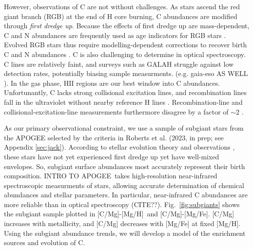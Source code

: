 \documentclass[fleqn,usenatbib]{mnras}
\newcommand{\apogee}{APOGEE}
\newcommand{\caah}{[C/Mg]-[Mg/H]}
\newcommand{\caafe}{[C/Mg]-[Mg/Fe]}
\newcommand{\about}[1]{${\sim} #1$}
\begin{document}


However, observations of C are not without challenges. 
As stars ascend the red giant branch (RGB) at the end of H core burning, C abundances are modified through \textit{first dredge up}\footnotemark{}. Because the effects of first dredge up are mass-dependent, C and N abundances are frequently used as age indicators for RGB stars \citep{MG15, martig16, hasselquist19, vincenzo+21}. Evolved RGB stars thus require modelling-dependent corrections to recover birth C and N abundances \citep[e.g.][]{vincenzo+21}. 
C is also challenging to determine in optical spectroscopy. 
C lines are relatively faint, and surveys such as GALAH struggle against low detection rates, potentially biasing sample measurments. 
(e.g. gaia-eso AS WELL \citealt{franchini+20}).
In the gas phase, HII regions are our best window into C abundances. Unfortunantly, C lacks strong collisional excitation lines, and recombination lines fall in the ultraviolet without nearby reference H lines \citep{skillman+20}. Recombination-line and collisional-excitation-line measurements furthermore disagree by a factor of \about{2} \citep{GR07}. 


    As our primary observational constraint, we use a sample of subgiant stars from the \apogee{} \citep{apogee17} selected by the criteria in Roberts et al. (2023, in prep; see Appendix \ref{sec:jack}).
According to stellar evolution theory and observations \citep{gilroy89, korn+07, lind+08, souto+18, souto19}, these stars have not yet experienced first dredge up yet have well-mixed envelopes. So, subgiant surface abundances most accurately represent their birth composition. 
INTRO TO \apogee\ takes high-resolution near-infrared spectroscopic measurments of stars, allowing accurate determination of chemical abundances and stellar parameters. In particular, near-infrared C abundances are more reliable than in optical spectroscopy (CITE??).
Fig.~\ref{fig:subgiants} shows the subgiant sample plotted in \caah\ and \caafe{}. [C/Mg] increases with metallicity, and [C/Mg] decreases with [Mg/Fe] at fixed [Mg/H]. 
Using the subgiant abundance trends, we will develop a model of the enrichment sources and evolution of C.
\end{document}
